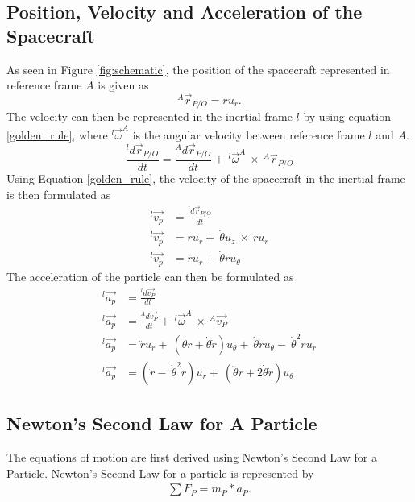 \documentclass[]{article}
\begin{document}
\subsection{Position, Velocity and Acceleration of the Spacecraft}
As seen in Figure \ref{fig:schematic}, the position of the spacecraft represented in reference frame \(A\) is given as 
\begin{equation} \label{position}
	^A\vec{r}_{P/O} = ru_{r}.
\end{equation}
The velocity can then be represented in the inertial frame \(l\) by using equation \ref{golden_rule}, where \(^l\vec{\omega}^A\) is the angular velocity between reference frame \(l\) and \(A\).
\begin{equation} \label{golden_rule}
	\frac{^ld\vec{r}_{P/O}}{dt} = \frac{^Ad\vec{r}_{P/O}}{dt} +\ ^l\vec{\omega}^A\  \times\  ^A\vec{r}_{P/O} 
\end{equation}
Using Equation \ref{golden_rule}, the velocity of the spacecraft in the inertial frame is then formulated as
\begin{align}
	^l\vec{v_{p}} &= \frac{^ld\vec{r}_{P/O}}{dt} \nonumber\\
	^l\vec{v_{p}} &= \dot{r}u_{r} +\ \dot{\theta}u_{z}\ \times\ ru_{r} \nonumber\\
	^l\vec{v_{p}} &= \dot{r}u_{r} +\ \dot{\theta}ru_{\theta} \label{velocity}
\end{align}
The acceleration of the particle can then be formulated as 
\begin{align}
    ^l\vec{a_{p}} &= \frac{^ld\vec{v_{P}}}{dt} \nonumber\\
	^l\vec{a_{p}} &= \frac{^Ad\vec{v_{P}}}{dt} +\ ^l\vec{\omega}^A\  \times\  ^A\vec{v_{P}} \nonumber\\
	^l\vec{a_{p}} &= \ddot{r}u_{r} +\ (\ddot{\theta}r+\dot{\theta}\dot{r})u_{\theta} +\ \dot{\theta}\dot{r}u_{\theta} -\ \dot{\theta}^2ru_{r} \nonumber\\
	^l\vec{a_{p}} &= (\ddot{r} -\ \dot{\theta}^2r)u_{r} +\ (\ddot{\theta}r+2\dot{\theta}\dot{r})u_{\theta}   \label{acceleration}
\end{align}

\subsection{Newton's Second Law for A Particle}
The equations of motion are first derived using Newton's Second Law for a Particle. Newton's Second Law for a particle is represented by
\begin{align}
	\sum{F_{P}} = m_{P} * a_{P}. \label{newton}
\end{align}
\end{document}
